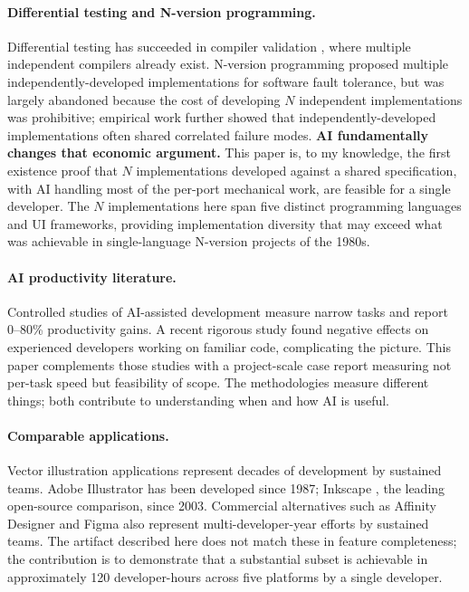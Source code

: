 \documentclass[10pt]{article}
\begin{document}
\paragraph{Differential testing and N-version programming.} Differential
testing \citep{mckeeman1998differential} has succeeded in compiler
validation \citep{yang2011csmith}, where multiple independent compilers
already exist. N-version programming \citep{avizienis1985nversion}
proposed multiple independently-developed implementations for software
fault tolerance, but was largely abandoned because the cost of
developing $N$ independent implementations was prohibitive; empirical
work \citep{knight1986independence} further showed that
independently-developed implementations often shared correlated failure
modes. \textbf{AI fundamentally changes that economic argument.} This
paper is, to my knowledge, the first existence proof that $N$
implementations developed against a shared specification, with AI
handling most of the per-port mechanical work, are feasible for a single
developer. The $N$ implementations here span five distinct programming
languages and UI frameworks, providing implementation diversity that may
exceed what was achievable in single-language N-version projects of the
1980s.

\paragraph{AI productivity literature.} Controlled studies of
AI-assisted development \citep{peng2023copilot,ziegler2024copilot}
measure narrow tasks and report 0--80\% productivity gains. A recent
rigorous study \citep{metr2025productivity} found negative effects on
experienced developers working on familiar code, complicating the
picture. This paper complements those studies with a project-scale case
report measuring not per-task speed but feasibility of scope. The
methodologies measure different things; both contribute to understanding
when and how AI is useful.

\paragraph{Comparable applications.} Vector illustration applications
represent decades of development by sustained teams. Adobe Illustrator
\citep{pfiffner2003adobe} has been developed since 1987; Inkscape
\citep{inkscape}, the leading open-source comparison, since 2003.
Commercial alternatives such as Affinity Designer and Figma also
represent multi-developer-year efforts by sustained teams. The artifact
described here does not match these in feature completeness; the
contribution is to demonstrate that a substantial subset is achievable
in approximately 120 developer-hours across five platforms by a single
developer.
\end{document}

